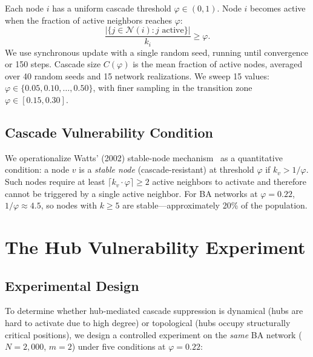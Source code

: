 \documentclass[aps,pre,twocolumn,superscriptaddress,showpacs]{revtex4-2}
\begin{document}
Each node $i$ has a uniform cascade threshold $\varphi \in (0,1)$. Node $i$ becomes active when the fraction of active neighbors reaches $\varphi$:
\begin{equation*}
\frac{|\{j \in \mathcal{N}(i) : j \text{ active}\}|}{k_i} \geq \varphi.
\end{equation*}
We use synchronous update with a single random seed, running until convergence or 150 steps. Cascade size $C(\varphi)$ is the mean fraction of active nodes, averaged over 40 random seeds and 15 network realizations. We sweep 15 values: $\varphi \in \{0.05, 0.10, \ldots, 0.50\}$, with finer sampling in the transition zone $\varphi \in [0.15, 0.30]$.

\subsection{Cascade Vulnerability Condition}

We operationalize Watts' (2002) stable-node mechanism~\cite{Watts2002} as a quantitative condition: a node $v$ is a \emph{stable node} (cascade-resistant) at threshold $\varphi$ if $k_v > 1/\varphi$. Such nodes require at least $\lceil k_v \cdot \varphi \rceil \geq 2$ active neighbors to activate and therefore cannot be triggered by a single active neighbor. For BA networks at $\varphi=0.22$, $1/\varphi \approx 4.5$, so nodes with $k \geq 5$ are stable---approximately 20\% of the population.

\section{The Hub Vulnerability Experiment}
\label{sec:hub_vuln}

\subsection{Experimental Design}

To determine whether hub-mediated cascade suppression is dynamical (hubs are hard to activate due to high degree) or topological (hubs occupy structurally critical positions), we design a controlled experiment on the \emph{same} BA network ($N=2{,}000$, $m=2$) under five conditions at $\varphi=0.22$:
\end{document}
